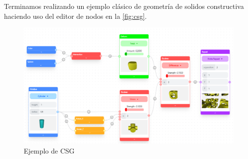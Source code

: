 Terminamos realizando un ejemplo clásico de geometría de solidos constructiva haciendo uso del editor de nodos en la \autoref{fig:csg}.
\begin{figure}[ht!]
    \centering
    \includegraphics[width=\textwidth]{Plantilla-TFG-master/img/ejemploCSG.png}
    \caption{Ejemplo de CSG}
    \label{fig:csg}
\end{figure}

